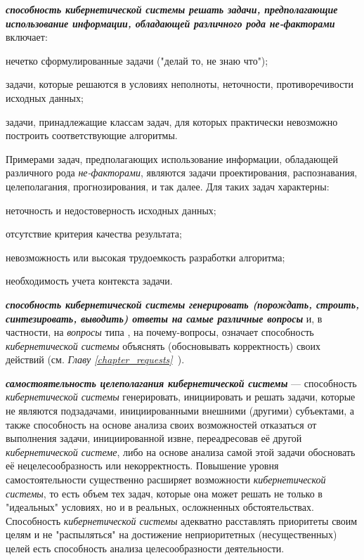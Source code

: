 \textbf{\textit{способность кибернетической системы решать задачи, предполагающие использование информации, обладающей различного рода не-факторами}} включает:
\begin{textitemize}
	\item нечетко сформулированные задачи ("делай то, не знаю что");
	\item задачи, которые решаются в условиях неполноты, неточности, противоречивости исходных данных;
	\item задачи, принадлежащие классам задач, для которых практически невозможно построить соответствующие алгоритмы.
\end{textitemize}
Примерами задач, предполагающих использование информации, обладающей различного рода \textit{не-факторами}, являются задачи проектирования, распознавания, целеполагания, прогнозирования, и так далее.
Для таких задач характерны:
\begin{textitemize}
    \item неточность и недостоверность исходных данных;
    \item отсутствие критерия качества результата;
    \item невозможность или высокая трудоемкость разработки алгоритма;
    \item необходимость учета контекста задачи.
\end{textitemize}

\textbf{\textit{способность кибернетической системы генерировать (порождать, строить, синтезировать, выводить) ответы на самые различные вопросы}} и, в частности, на \textit{вопросы} типа , на почему-вопросы, означает способность \textit{кибернетической системы} объяснять (обосновывать корректность) своих действий (см. \textit{Главу \ref{chapter_requests}~}).

\textbf{\textit{самостоятельность целеполагания кибернетической системы}} --- способность \textit{кибернетической системы} генерировать, инициировать и решать задачи, которые не являются подзадачами, инициированными внешними (другими) субъектами, а также способность на основе анализа своих возможностей отказаться от выполнения задачи, инициированной извне, переадресовав её другой \textit{кибернетической системе}, либо на основе анализа самой этой задачи обосновать её нецелесообразность или некорректность.  Повышение уровня самостоятельности существенно расширяет возможности \textit{кибернетической системы}, то есть объем тех задач, которые она может решать не только в "идеальных"{} условиях, но и в реальных, осложненных обстоятельствах. Способность \textit{кибернетической системы} адекватно расставлять приоритеты своим целям и не "распыляться"{} на достижение неприоритетных (несущественных) целей есть способность анализа целесообразности деятельности.

